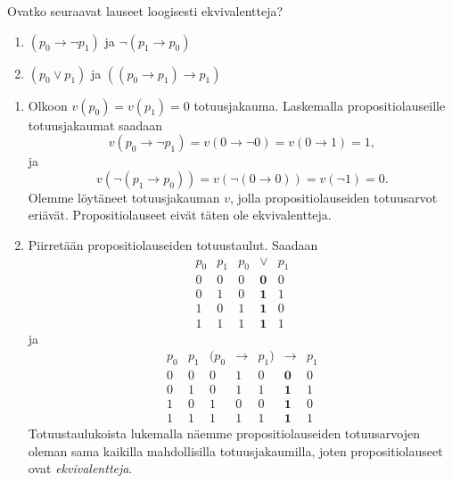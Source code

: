 \documentclass[12pt,a4paper]{article}
\begin{document}
\begin{exercise}
Ovatko seuraavat lauseet loogisesti ekvivalentteja?
\begin{enumerate}[label=\alph*), nosep]
\item \((p_0 \rightarrow \neg p_1)\) ja \(\neg(p_1 \rightarrow p_0)\)
\item \((p_0 \lor p_1)\) ja \(((p_0 \rightarrow p_1) \rightarrow p_1)\)
\end{enumerate}
\end{exercise}

\begin{solution}
\leavevmode\par
\begin{enumerate}[label=\alph*), nosep]
\item Olkoon \(v(p_0) = v(p_1) = 0\) totuusjakauma. Laskemalla
propositiolauseille totuusjakaumat saadaan
\[
v(p_0 \rightarrow \neg p_1) = v(0 \rightarrow \neg 0) = v(0 \rightarrow 1) = 1,
\]
ja
\[
v(\neg(p_1 \rightarrow p_0)) = v(\neg(0 \rightarrow 0)) = v(\neg 1) = 0.
\]
Olemme löytäneet totuusjakauman \(v\), jolla propositiolauseiden totuusarvot
eriävät. Propositiolauseet eivät täten ole ekvivalentteja.

\item Piirretään propositiolauseiden totuustaulut. Saadaan
\[
\begin{array}{cc|ccc}
p_0 & p_1 & p_0 & \boldsymbol{\lor} & p_1 \\
\hline
0 & 0 & 0 & \mathbf{0} & 0 \\
0 & 1 & 0 & \mathbf{1} & 1 \\
1 & 0 & 1 & \mathbf{1} & 0 \\
1 & 1 & 1 & \mathbf{1} & 1
\end{array}
\]
ja
\[
\begin{array}{cc|ccccc}
p_0 & p_1 & (p_0 & \rightarrow & p_1) & \boldsymbol{\rightarrow} & p_1 \\
\hline
0 & 0 & 0 & 1 & 0 & \mathbf{0} & 0 \\
0 & 1 & 0 & 1 & 1 & \mathbf{1} & 1 \\
1 & 0 & 1 & 0 & 0 & \mathbf{1} & 0 \\
1 & 1 & 1 & 1 & 1 & \mathbf{1} & 1
\end{array}
\]
Totuustaulukoista lukemalla näemme propositiolauseiden totuusarvojen
oleman sama kaikilla mahdollisilla totuusjakaumilla, joten propositiolauseet
ovat \emph{ekvivalentteja}.
\end{enumerate}
\end{solution}
\end{document}
